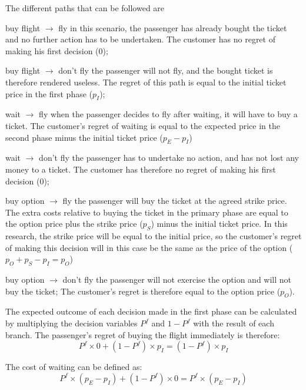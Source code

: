 \noindent
The different paths that can be followed are
\begin{compactdesc}
\item[buy flight $\rightarrow$ fly] in this scenario, the passenger has already bought the ticket and no further action has to be undertaken. The customer has no regret of making his first decision ($0$);
\item[buy flight $\rightarrow$ don't fly] the passenger will not fly, and the bought ticket is therefore rendered useless. The regret of this path is equal to the initial ticket price in the first phase ($p_I$);
\item[wait $\rightarrow$ fly] when the passenger decides to fly after waiting, it will have to buy a ticket. The customer's regret of waiting is equal to the expected price in the second phase minus the initial ticket price ($p_E - p_I$)
\item[wait $\rightarrow$ don't fly] the passenger has to undertake no action, and has not lost any money to a ticket. The customer has therefore no regret of making his first decision ($0$);
\item[buy option $\rightarrow$ fly] the passenger will buy the ticket at the agreed strike price. The extra costs relative to buying the ticket in the primary phase are equal to the option price plus the strike price ($p_S$) minus the initial ticket price. In this research, the strike price will be equal to the initial price, so the customer's regret of making this decision will in this case be the same as the price of the option ($p_O + p_S - p_I = p_O$)
\item[buy option $\rightarrow$ don't fly] the passenger will not exercise the option and will not buy the ticket; The customer's regret is therefore equal to the option price ($p_O$).
\vspace{1ex}
\end{compactdesc}

The expected outcome of each decision made in the first phase can be calculated by multiplying the decision variables $P^f$ and $1 - P^f$ with the result of each branch. The passenger's regret of buying the flight immediately is therefore:
\begin{equation*}
P^f \times 0 + (1 - P^f) \times p_I = (1 - P^f) \times p_I
\end{equation*}

The cost of waiting can be defined as:
\begin{equation*}
P^f \times (p_E - p_I) + (1 - P^f) \times 0 = P^f \times (p_E - p_I)
\end{equation*}

